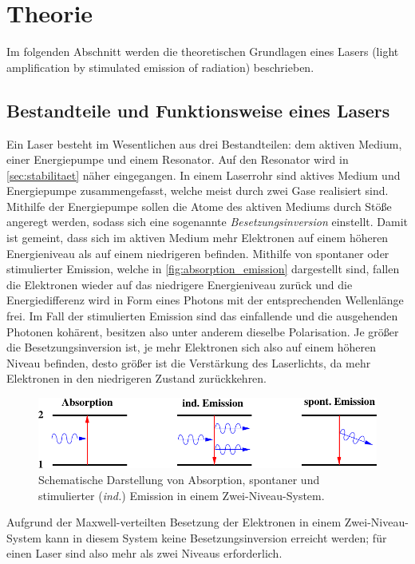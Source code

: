 \section{Theorie}
\label{sec:theorie}

    Im folgenden Abschnitt werden die theoretischen Grundlagen eines Lasers (light amplification by stimulated emission of radiation) beschrieben.

\subsection{Bestandteile und Funktionsweise eines Lasers}

    Ein Laser besteht im Wesentlichen aus drei Bestandteilen:
    dem aktiven Medium, einer Energiepumpe und einem Resonator.
    Auf den Resonator wird in \autoref{sec:stabilitaet} näher eingegangen.
    In einem Laserrohr sind aktives Medium und Energiepumpe zusammengefasst,
    welche meist durch zwei Gase realisiert sind.
    Mithilfe der Energiepumpe sollen die Atome des aktiven Mediums durch Stöße angeregt werden,
    sodass sich eine sogenannte \textit{Besetzungsinversion} einstellt.
    Damit ist gemeint,
    dass sich im aktiven Medium mehr Elektronen auf einem höheren Energieniveau als auf einem niedrigeren befinden.
    Mithilfe von spontaner oder stimulierter Emission,
    welche in \autoref{fig:absorption_emission} dargestellt sind,
    fallen die Elektronen wieder auf das niedrigere Energieniveau zurück
    und die Energiedifferenz wird in Form eines Photons mit der entsprechenden Wellenlänge frei.
    Im Fall der stimulierten Emission sind das einfallende und die ausgehenden Photonen kohärent,
    besitzen also unter anderem dieselbe Polarisation.
    Je größer die Besetzungsinversion ist,
    je mehr Elektronen sich also auf einem höheren Niveau befinden,
    desto größer ist die Verstärkung des Laserlichts,
    da mehr Elektronen in den niedrigeren Zustand zurückkehren.
    \begin{figure}[H]
       \centering
       \includegraphics[width=\textwidth]{content/img/Altanleitung/Abb_1_edit.pdf}
       \caption{Schematische Darstellung von Absorption, spontaner und stimulierter (\textit{ind.}) Emission in einem Zwei-Niveau-System. \cite{versuchsanleitung}}
       \label{fig:absorption_emission}
    \end{figure}
    Aufgrund der Maxwell-verteilten Besetzung der Elektronen in einem Zwei-Niveau-System kann in diesem System keine Besetzungsinversion erreicht werden;
    für einen Laser sind also mehr als zwei Niveaus erforderlich.


